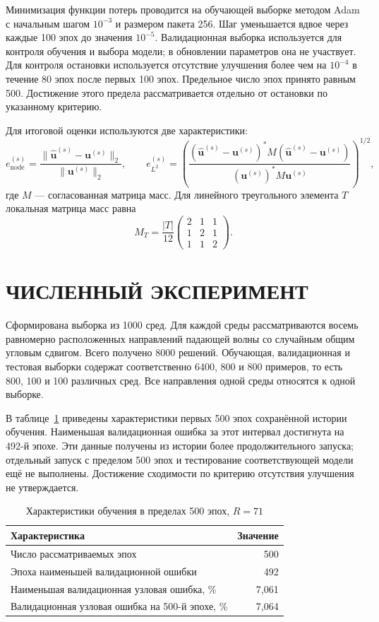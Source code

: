 \documentclass[notitle]{sibjima_preview}
\begin{document}
Минимизация функции потерь проводится на обучающей выборке методом Adam с начальным шагом \(10^{-3}\) и размером пакета 256. Шаг уменьшается вдвое через каждые 100 эпох до значения \(10^{-5}\). Валидационная выборка используется для контроля обучения и выбора модели; в обновлении параметров она не участвует. Для контроля остановки используется отсутствие улучшения более чем на \(10^{-4}\) в течение 80 эпох после первых 100 эпох. Предельное число эпох принято равным 500. Достижение этого предела рассматривается отдельно от остановки по указанному критерию.

Для итоговой оценки используются две характеристики:
\begin{equation*}
e_{\mathrm{node}}^{(s)}
=\frac{\|\widehat{\bm{u}}^{(s)}-\bm{u}^{(s)}\|_2}
{\|\bm{u}^{(s)}\|_2},\qquad
e_{L^2}^{(s)}
=\left(
\frac{(\widehat{\bm{u}}^{(s)}-\bm{u}^{(s)})^*M
(\widehat{\bm{u}}^{(s)}-\bm{u}^{(s)})}
{(\bm{u}^{(s)})^*M\bm{u}^{(s)}}
\right)^{1/2},
\end{equation*}
где \(M\) --- согласованная матрица масс. Для линейного треугольного элемента \(T\) локальная матрица масс равна
\begin{equation*}
M_T=\frac{|T|}{12}
\begin{pmatrix}2&1&1\\1&2&1\\1&1&2\end{pmatrix}.
\end{equation*}

\section{ЧИСЛЕННЫЙ ЭКСПЕРИМЕНТ}
Сформирована выборка из 1000 сред. Для каждой среды рассматриваются восемь равномерно расположенных направлений падающей волны со случайным общим угловым сдвигом. Всего получено 8000 решений. Обучающая, валидационная и тестовая выборки содержат соответственно 6400, 800 и 800 примеров, то есть 800, 100 и 100 различных сред. Все направления одной среды относятся к одной выборке.

В таблице~\ref{tab:results} приведены характеристики первых 500 эпох сохранённой истории обучения. Наименьшая валидационная ошибка за этот интервал достигнута на 492-й эпохе. Эти данные получены из истории более продолжительного запуска; отдельный запуск с пределом 500 эпох и тестирование соответствующей модели ещё не выполнены. Достижение сходимости по критерию отсутствия улучшения не утверждается.
\begin{table}[htbp]
\centering
\caption{Характеристики обучения в пределах 500 эпох, \(R=71\)}
\label{tab:results}
\begin{tabular}{@{}lr@{}}
\toprule
Характеристика & Значение\\
\midrule
Число рассматриваемых эпох & 500\\
Эпоха наименьшей валидационной ошибки & 492\\
Наименьшая валидационная узловая ошибка, \% & 7,061\\
Валидационная узловая ошибка на 500-й эпохе, \% & 7,064\\
\bottomrule
\end{tabular}
\end{table}
\end{document}
